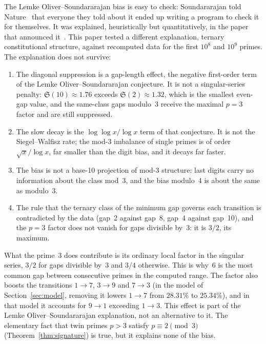 \documentclass[12pt,a4paper]{article}
\theoremstyle{plain}
\theoremstyle{definition}
\theoremstyle{remark}
\begin{document}
The Lemke Oliver--Soundararajan bias is easy to check: Soundararajan told
Nature~\cite{Lam16} that everyone they told about it ended up writing a program to check
it for themselves. It was explained, heuristically but quantitatively, in the paper that
announced it~\cite{LOS16}. This paper tested a different explanation, ternary
constitutional structure, against recomputed data for the first $10^8$ and $10^9$
primes. The explanation does not survive:
\begin{enumerate}[label=(\roman*)]
  \item The diagonal suppression is a gap-length effect, the negative first-order term
    of the Lemke Oliver--Soundararajan conjecture. It is not a singular-series penalty:
    $\mathfrak{S}(10) \approx 1.76$ exceeds $\mathfrak{S}(2) \approx 1.32$, which is the
    smallest even-gap value, and the same-class gaps modulo~3 receive the maximal
    $p = 3$ factor and are still suppressed.
  \item The slow decay is the $\log\log x/\log x$ term of that conjecture. It is not the
    Siegel--Walfi{}sz rate; the mod-3 imbalance of single primes is of order
    $\sqrt{x}/\log x$, far smaller than the digit bias, and it decays far faster.
  \item The bias is not a base-10 projection of mod-3 structure: last digits carry no
    information about the class mod~3, and the bias modulo~4 is about the same as
    modulo~3.
  \item The rule that the ternary class of the minimum gap governs each transition is
    contradicted by the data (gap~2 against gap~8, gap~4 against gap~10), and the
    $p = 3$ factor does not vanish for gaps divisible by~3: it is $3/2$, its maximum.
\end{enumerate}

What the prime~3 does contribute is its ordinary local factor in the singular series,
$3/2$ for gaps divisible by~3 and $3/4$ otherwise. This is why~6 is the most common
gap between consecutive primes in the computed range. The factor also boosts the
transitions $1 \to 7$, $3 \to 9$ and $7 \to 3$ (in the model of
Section~\ref{sec:model}, removing it lowers $1 \to 7$ from $28.31\%$ to $25.34\%$), and
in that model it accounts for $9 \to 1$ exceeding $1 \to 3$.
This effect is part of the Lemke Oliver--Soundararajan explanation, not an alternative to
it. The elementary fact that twin primes $p > 3$ satisfy $p \equiv 2 \pmod 3$
(Theorem~\ref{thm:signature}) is true, but it explains none of the bias.
\end{document}
